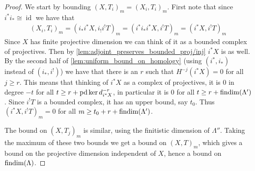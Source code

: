 \begin{theorem}
\begin{proof}
		We start by bounding $(X, T_i)_m = (X_i, T_i)_m$. First note that since  $i^*i_* \cong \operatorname{id}$ we have that
		\begin{align*}
			(X_i, T_i)_m = (i_*i^* X, i_!i^!T)_m = (i^*i_*i^* X, i^!T)_m = (i^* X, i^!T)_m
		\end{align*}
		Since $X$ has finite projective dimension we can think of it as a bounded complex of projectives. Then by \cref{lem:adjoint_preserves_bounded_proj/inj} $i^*X$ is as well. By the second half of \cref{lem:uniform_bound_on_homology} (using $(i^*, i_*)$ instead of $(i_*, i^!)$) we have that there is an $r$ such that $H^{-j}(i^*X)=0$ for all $j \geq r$. This means that thinking of $i^*X$ as a complex of projectives, it is 0 in degree $-t$ for all $t \geq r + \operatorname{pd}\ker d^{-r}_{i^*X}$, in particular it is 0 for all $t\geq r + \operatorname{findim}(\Lambda')$. Since $i^!T$ is a bounded complex, it has an upper bound, say $t_0$. Thus $(i^* X, i^!T)_m = 0$ for all $m \geq t_0 + r + \operatorname{findim}(\Lambda')$.
		
		The bound on $(X, T_j)_m$ is similar, using the finitistic dimension of $\Lambda''$. Taking the maximum of these two bounds we get a bound on $(X, T)_m$, which gives a bound on the projective dimension independent of $X$, hence a bound on $\operatorname{findim}(\Lambda)$. 
	\end{proof}
\end{theorem}